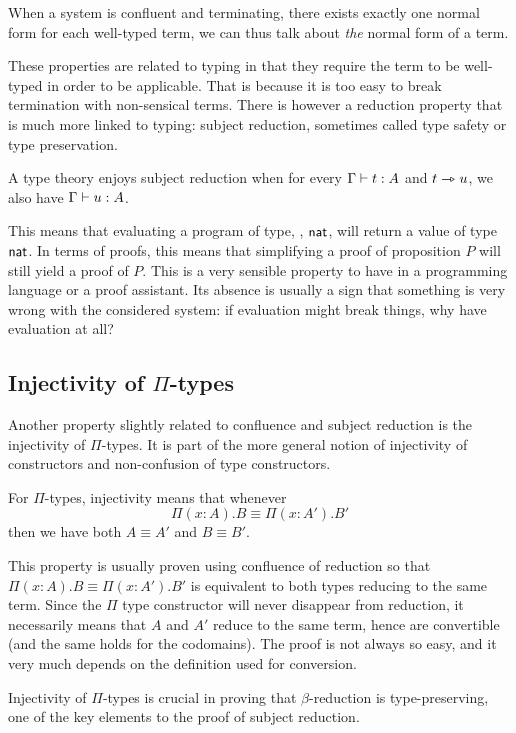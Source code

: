 When a system is confluent and terminating, there exists exactly one normal form
for each well-typed term, we can thus talk about \emph{the} normal form of a
term.

These properties are related to typing in that they require the term to be
well-typed in order to be applicable. That is because it is too easy to break
termination with non-sensical terms.
There is however a reduction property that is much more linked to typing:
subject reduction, sometimes called type safety or type preservation.

\begin{definition}
  A type theory enjoys subject reduction when for every \(\Gamma \vdash t : A\)
  and \(t \rightarrowtriangle u\), we also have \(\Gamma \vdash u : A\).
\end{definition}

This means that evaluating a program of type, \eg, \(\mathsf{nat}\), will return a
value of type \(\mathsf{nat}\). In terms of proofs, this means that simplifying a proof
of proposition \(P\) will still yield a proof of \(P\). This is a very
sensible property to have in a programming language or a proof assistant.
Its absence is usually a sign that something is very wrong with the considered
system: if evaluation might break things, why have evaluation at all?

\subsection{Injectivity of \(\Pi\)-types}

Another property slightly related to confluence and subject reduction is
the injectivity of \(\Pi\)-types. It is part of the more general notion of
injectivity of constructors and non-confusion of type constructors.

For \(\Pi\)-types, injectivity means that whenever
\[
  \Pi (x:A).B \equiv \Pi (x:A').B'
\]
then we have both \(A \equiv A'\) and \(B \equiv B'\).

This property is usually proven using confluence of reduction so that
\(\Pi (x:A).B \equiv \Pi (x:A').B'\) is equivalent to both types
reducing to the same term. Since the \(\Pi\) type constructor will never
disappear from reduction, it necessarily means that \(A\) and \(A'\) reduce to
the same term, hence are convertible (and the same holds for the codomains).
The proof is not always so easy, and it very much depends on the definition
used for conversion.

Injectivity of \(\Pi\)-types is crucial in proving that \(\beta\)-reduction is
type-preserving, one of the key elements to the proof of subject reduction.

